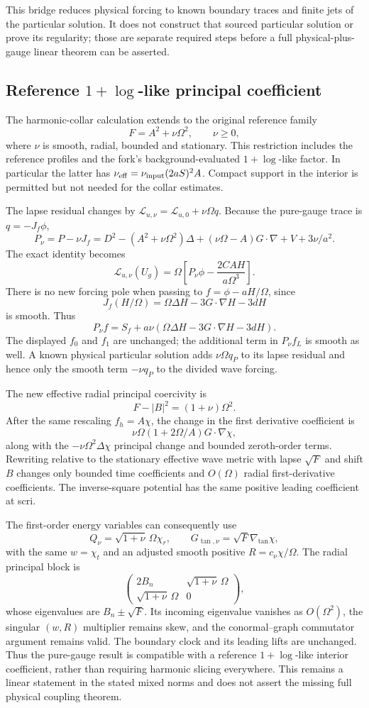 This bridge reduces physical forcing to known boundary traces and finite jets of the particular solution. It does not construct that sourced particular solution or prove its regularity; those are separate required steps before a full physical-plus-gauge linear theorem can be asserted.
\subsection{Reference $1+\log$-like principal coefficient}
The harmonic-collar calculation extends to the original reference family
\[
 F=A^2+\nu\Omega^2,\qquad \nu\ge0,
\]
where $\nu$ is smooth, radial, bounded and stationary. This restriction includes the reference profiles and the fork's background-evaluated $1+\log$-like factor. In particular the latter has $\nu_{\rm eff}=\nu_{\rm input}(2aS)^2A$. Compact support in the interior is permitted but not needed for the collar estimates.

The lapse residual changes by $\mathcal L_{u,\nu}=\mathcal L_{u,0}+\nu\Omega q$. Because the pure-gauge trace is $q=-J_f\phi$,
\[
 P_\nu=P-\nu J_f
 =D^2-(A^2+\nu\Omega^2)\Delta
 +(\nu\Omega-A)G\cdot\nabla+V+3\nu/a^2.
\]
The exact identity becomes
\[
 \mathcal L_{u,\nu}(U_g)
 =\Omega\left[P_\nu\phi-\frac{2CAH}{a\Omega^3}\right].
\]
There is no new forcing pole when passing to $f=\phi-aH/\Omega$, since
\[
 J_f(H/\Omega)=\Omega\Delta H-3G\cdot\nabla H-3dH
\]
is smooth. Thus
\[
 P_\nu f=S_f+a\nu(\Omega\Delta H-3G\cdot\nabla H-3dH).
\]
The displayed $f_0$ and $f_1$ are unchanged; the additional term in $P_\nu f_L$ is smooth as well. A known physical particular solution adds $\nu\Omega q_P$ to its lapse residual and hence only the smooth term $-\nu q_P$ to the divided wave forcing.

The new effective radial principal coercivity is
\[
 F-|B|^2=(1+\nu)\Omega^2.
\]
After the same rescaling $f_h=A\chi$, the change in the first derivative coefficient is
\[
 \nu\Omega(1+2\Omega/A)G\cdot\nabla\chi,
\]
along with the $-\nu\Omega^2\Delta\chi$ principal change and bounded zeroth-order terms. Rewriting relative to the stationary effective wave metric with lapse $\sqrt F$ and shift $B$ changes only bounded time coefficients and $O(\Omega)$ radial first-derivative coefficients. The inverse-square potential has the same positive leading coefficient at scri.

The first-order energy variables can consequently use
\[
 Q_\nu=\sqrt{1+\nu}\,\Omega\chi_r,
 \qquad G_{\tan,\nu}=\sqrt F\nabla_{\tan}\chi,
\]
with the same $w=\chi_t$ and an adjusted smooth positive $R=c_\nu\chi/\Omega$. The radial principal block is
\[
 \begin{pmatrix}2B_n&\sqrt{1+\nu}\,\Omega\\
 \sqrt{1+\nu}\,\Omega&0\end{pmatrix},
\]
whose eigenvalues are $B_n\pm\sqrt F$. Its incoming eigenvalue vanishes as $O(\Omega^2)$, the singular $(w,R)$ multiplier remains skew, and the conormal--graph commutator argument remains valid. The boundary clock and its leading lifts are unchanged. Thus the pure-gauge result is compatible with a reference $1+\log$-like interior coefficient, rather than requiring harmonic slicing everywhere. This remains a linear statement in the stated mixed norms and does not assert the missing full physical coupling theorem.
